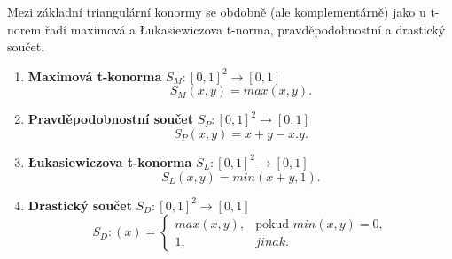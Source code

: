 Mezi základní triangulární konormy se obdobně (ale komplementárně) jako u t-norem řadí maximová a Łukasiewiczova t-norma, pravděpodobnostní a drastický součet.
\begin{example}
\cite{hlinena}
    \begin{enumerate}
    \item \textbf{Maximová t-konorma} $S_M: [0,1]^2 \rightarrow [0,1]$
    $$S_M(x,y) = max(x,y).$$
    \item \textbf{Pravděpodobnostní součet} $S_P: [0,1]^2 \rightarrow [0,1]$
    $$S_P(x,y) = x+y-x.y.$$
    \item \textbf{Łukasiewiczova t-konorma} $S_L: [0,1]^2 \rightarrow [0,1]$
    $$S_L(x,y) = min(x+y,1).$$
    \item \textbf{Drastický součet} $S_D: [0,1]^2 \rightarrow [0,1]$
    $$S_D:(x)=\begin{cases} max(x,y), & \mbox{pokud  }  min(x,y) = 0,\\ 
    1, &  jinak.  \end{cases}$$
\end{enumerate}
\end{example}

